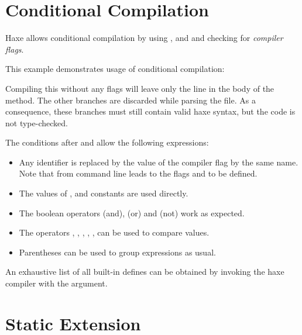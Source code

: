 \documentclass{haxe}
\begin{document}
\section{Conditional Compilation}
\label{lf-condition-compliation}

Haxe allows conditional compilation by using ,  and  and checking for \emph{compiler flags}.


This example demonstrates usage of conditional compilation:

Compiling this without any flags will leave only the  line in the body of the  method. The other branches are discarded while parsing the file. As a consequence, these branches must still contain valid haxe syntax, but the code is not type-checked.

The conditions after  and  allow the following expressions:

\begin{itemize}
	\item Any identifier is replaced by the value of the compiler flag by the same name. Note that  from command line leads to the flags  and  to be defined.
	\item The values of ,  and  constants are used directly.
	\item The boolean operators \expr{\&\&} (and), \expr{||} (or) and \expr{!} (not) work as expected.
	\item The operators \expr{==}, \expr{!=}, \expr{>}, \expr{>=}, \expr{<}, \expr{<=} can be used to compare values.
	\item Parentheses \expr{()} can be used to group expressions as usual.
\end{itemize}
An exhaustive list of all built-in defines can be obtained by invoking the haxe compiler with the  argument.


\section{Static Extension}
\label{lf-static-extension}
\end{document}
